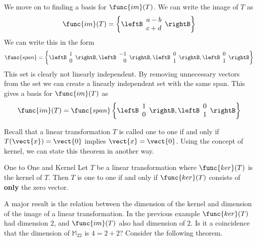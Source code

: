 \begin{solution}
We move on to finding a basis for $\func{im}(T)$. We can write the image of $T$ as 
\[
\func{im}(T) = \left\{ \leftB \begin{array}{c}
a - b \\
c + d
\end{array} \rightB
\right\}
\]
We can write this in the form
\[
\func{span} = \left\{ 
\leftB \begin{array}{r}
1 \\
0
\end{array} \rightB, 
\leftB \begin{array}{r}
-1 \\
0
\end{array} \rightB, 
\leftB \begin{array}{r}
0 \\
1
\end{array} \rightB, 
\leftB \begin{array}{r}
0 \\
1
\end{array} \rightB \right\}
\]
This set is clearly not linearly independent. By removing unnecessary vectors from the set we can create a linearly independent set with the same span. This gives a basis for $\func{im}(T)$ as
\[
\func{im}(T) = \func{span} \left\{
\leftB \begin{array}{r}
1 \\
0
\end{array} \rightB,
\leftB \begin{array}{r}
0 \\
1
\end{array} \rightB
\right\}
\]
\end{solution}

Recall that a linear transformation $T$ is called one to one if and only if $T(\vect{x}) = \vect{0}$ implies $\vect{x} = \vect{0}$. Using the concept of kernel, we can state this theorem in another way.

\begin{theorem}{One to One and Kernel}\label{thm:onetoonekernel}
Let $T$ be a linear transformation where $\func{ker}(T)$ is the kernel of $T$. Then $T$ is one to one if and only if $\func{ker}(T)$ consists of \textbf{only} the zero vector. 
\end{theorem}

A major result is the relation between the dimension of the kernel and
dimension of the image of a linear transformation. In the previous example $\func{ker}(T)$ had dimension $2$, and $\func{im}(T)$ also had dimension of $2$. Is it a coincidence that the dimension of $\mathbb{M}_{22}$ is $4 = 2 + 2$? Consider the following theorem. 


